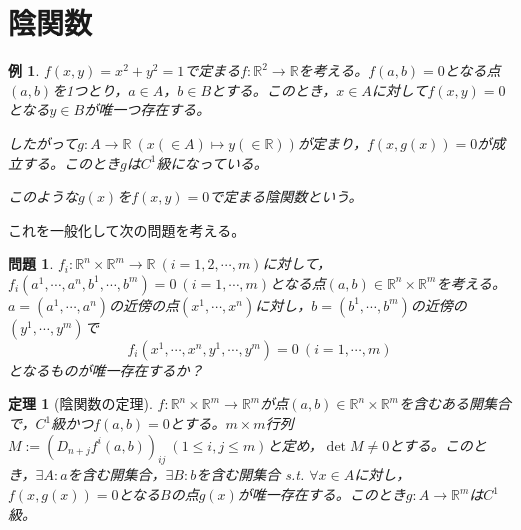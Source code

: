 \documentclass[dvipdfmx,a4j,10pt]{jsarticle}
\theoremstyle{mystyle1}
\newtheorem{thm}[dfn]{定理}
\theoremstyle{mystyle2}
\newtheorem{example}{例}
\newtheorem{qes}{問題}
\begin{document}
\newpage


\section{陰関数}
\begin{example}
	$f(x,y)=x^2+y^2=1$で定まる$f:\mathbb{R}^2\to\mathbb{R}$を考える。$f(a,b)=0$となる点$(a,b)$を1つとり，$a\in A$，$b\in B$とする。このとき，$x\in A$に対して$f(x,y)=0$となる$y\in B$が唯一つ存在する。

	したがって$g:A\to\mathbb{R}\ (x(\in A)\mapsto y(\in\mathbb{R}))$が定まり，$f(x,g(x))=0$が成立する。このとき$g$は$C^1$級になっている。

	このような$g(x)$を$f(x,y)=0$で定まる陰関数という。
\end{example}

これを一般化して次の問題を考える。

\begin{qes}
	$f_i:\mathbb{R}^n\times\mathbb{R}^m\to\mathbb{R}\ (i=1,2,\cdots,m)$に対して，	$f_i(a^1,\cdots,a^n,b^1,\cdots,b^m)=0\ (i=1,\cdots,m)$となる点$(a,b)\in\mathbb{R}^n\times\mathbb{R}^m$を考える。$a=(a^1,\cdots,a^n)$の近傍の点$(x^1,\cdots,x^n)$に対し，$b=(b^1,\cdots,b^m)$の近傍の$(y^1,\cdots,y^m)$で
	\[
	f_i(x^1,\cdots,x^n,y^1,\cdots,y^m)=0\ (i=1,\cdots,m)
	\]
	となるものが唯一存在するか？
\end{qes}

\begin{framed}
	\begin{thm}[陰関数の定理]
		$f:\mathbb{R}^n\times\mathbb{R}^m\to\mathbb{R}^m$が点$(a,b)\in\mathbb{R}^n\times\mathbb{R}^m$を含むある開集合で，$C^1$級かつ$f(a,b)=0$とする。$m\times m$行列$M:=(D_{n+j}f^i(a,b))_{ij}\ (1\leq i,j\leq m)$と定め，$\det M\neq 0$とする。このとき，$\exists A:a$を含む開集合，$\exists B:b$を含む開集合 s.t. $\forall x\in A$に対し，$f(x,g(x))=0$となる$B$の点$g(x)$が唯一存在する。このとき$g:A\to\mathbb{R}^m$は$C^1$級。
	\end{thm}
\end{framed}
\end{document}

